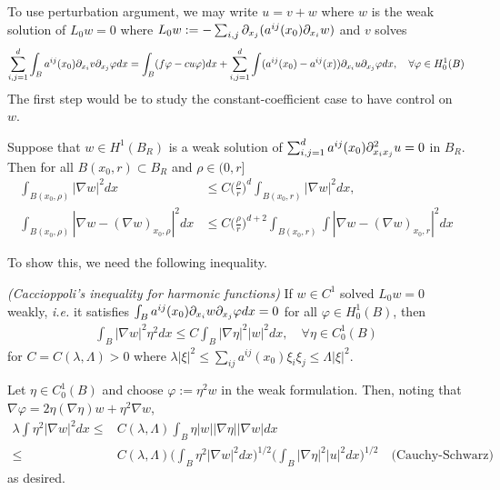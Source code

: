 \documentclass[12pt,a4paper]{article}
\newenvironment{proof}
{\begin{changemargin}{0.5cm}{0.5cm} 
	}%
	{\end{changemargin}
}
\newenvironment{p}
{\begin{proof} 
	}%
	{\end{proof}
}
\begin{document}
\quad To use perturbation argument, we may write $u= v+w$ where $w$ is the weak solution of $L_0 w =0$ where $L_0 w := - \sum_{i,j} \partial_{x_j}(a^{ij}(x_0) \partial_{x_i} w)$ and $v$ solves
\begin{align*}
\sum_{i,j=1}^d \int_B a^{ij}(x_0) \partial_{x_i} v \partial_{x_j} \varphi dx = \int_B (f\varphi - cu\varphi) dx +\sum_{i,j=1}^d \int (a^{ij}(x_0) - a^{ij}(x)) \partial_{x_i} u \partial_{x_j} \varphi dx, \quad \forall \varphi \in H_0^1(B)
\end{align*}
The first step would be to study the constant-coefficient case to have control on $w$.
\s

\prop Suppose that $w\in H^1(B_R)$ is a weak solution of $\sum_{i,j=1}^d a^{ij}(x_0) \partial^2_{x_i x_j} u =0$ in $B_R$. Then for all $B(x_0, r) \subset B_R$ and $\rho \in (0, r]$ 
\begin{align*}
\int_{B(x_0, \rho)} |\nabla w|^2 dx & \leq C \big(\frac{\rho}{r} \big)^d \int_{B(x_0, r)}|\nabla w|^2 dx, \\
\int_{B(x_0, \rho)} |\nabla w - (\nabla w)_{x_0, \rho}|^2 dx & \leq C \big( \frac{\rho}{r} \big)^{d+2} \int_{B(x_0, r)} \int |\nabla w - (\nabla w)_{x_0, r}|^2 dx
\end{align*}
\s

To show this, we need the following inequality.
\s

\thm \emph{(Caccioppoli's inequality for harmonic functions)} If $w\in C^1$ solved $L_0 w= 0$ weakly, \textit{i.e.} it satisfies $\int_B a^{ij}(x_0) \partial_{x_i} w \partial_{x_j} \varphi dx =0$ for all $\varphi \in H_0^1(B)$, then 
\begin{align*}
\int_B |\nabla w|^2 \eta^2 dx \leq C \int_B |\nabla \eta|^2 |w|^2 dx, \quad \forall \eta \in C^1_0(B)
\end{align*}
for $C= C(\lambda, \Lambda) >0$ where $\lambda |\xi|^2 \leq \sum_{ij} a^{ij}(x_0) \xi_i \xi_j \leq \Lambda |\xi|^2$. 
\begin{p}
\pf Let $\eta \in C_0^1(B)$ and choose $\varphi := \eta^2 w$ in the weak formulation. Then, noting that $\nabla \varphi = 2\eta (\nabla \eta) w + \eta^2 \nabla w$,
\begin{align*}
\lambda \int \eta^2 |\nabla w|^2 dx \leq & C(\lambda, \Lambda) \int_B \eta |w| |\nabla \eta| |\nabla w| dx \\
\leq & C(\lambda, \Lambda) \Big( \int_{B} \eta^2 |\nabla w|^2 dx \Big)^{1/2} \Big( \int_B |\nabla \eta|^2 |u|^2 dx \Big)^{1/2} \quad \text{(Cauchy-Schwarz)}
\end{align*}
as desired.

\eop
\end{p}
\s
\end{document}
